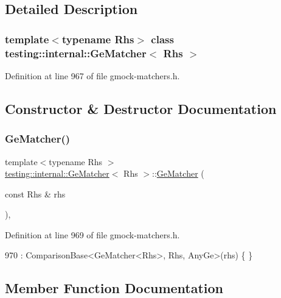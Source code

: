 \subsection{Detailed Description}
\subsubsection*{template$<$typename Rhs$>$\newline
class testing\+::internal\+::\+Ge\+Matcher$<$ Rhs $>$}



Definition at line 967 of file gmock-\/matchers.\+h.



\subsection{Constructor \& Destructor Documentation}
\mbox{\label{classtesting_1_1internal_1_1GeMatcher_aba23cbb4040d08be1a9db09b73906182}} 
\subsubsection{\texorpdfstring{Ge\+Matcher()}{GeMatcher()}}
{\footnotesize\ttfamily template$<$typename Rhs $>$ \\
\hyperlink{classtesting_1_1internal_1_1GeMatcher}{testing\+::internal\+::\+Ge\+Matcher}$<$ Rhs $>$\+::\hyperlink{classtesting_1_1internal_1_1GeMatcher}{Ge\+Matcher} (\begin{DoxyParamCaption}\item[{const Rhs \&}]{rhs }\end{DoxyParamCaption})\hspace{0.3cm}{\ttfamily [inline]}, {\ttfamily [explicit]}}



Definition at line 969 of file gmock-\/matchers.\+h.


\begin{DoxyCode}
970       : ComparisonBase<GeMatcher<Rhs>, Rhs, AnyGe>(rhs) \{ \}
\end{DoxyCode}


\subsection{Member Function Documentation}
\mbox{\label{classtesting_1_1internal_1_1GeMatcher_a5676836bfa354f4398dd083621a05877}} 
